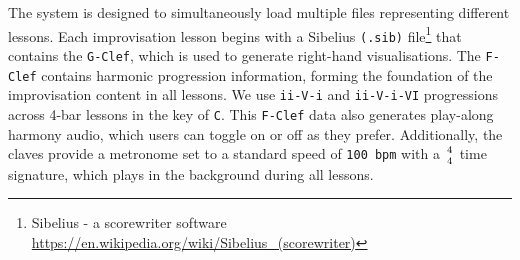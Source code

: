 \documentclass{vgtc}                          %
\begin{document}
\par %
The system is designed to simultaneously load multiple files representing different lessons. Each improvisation lesson begins with a Sibelius \texttt{(.sib)} file\footnote{Sibelius - a scorewriter software \url{https://en.wikipedia.org/wiki/Sibelius_(scorewriter)}} that contains the \texttt{G-Clef}, which is used to generate right-hand visualisations. The \texttt{F-Clef} contains harmonic progression information, forming the foundation of the improvisation content in all lessons. We use \texttt{ii-V-i} and \texttt{ii-V-i-VI} progressions across 4-bar lessons in the key of \texttt{C}. This \texttt{F-Clef} data also generates play-along harmony audio, which users can toggle on or off as they prefer. Additionally, the claves provide a metronome set to a standard speed of \texttt{100 bpm} with a $\genfrac{}{}{0pt}{}{4}{4}$ time signature, which plays in the background during all lessons.
\end{document}
